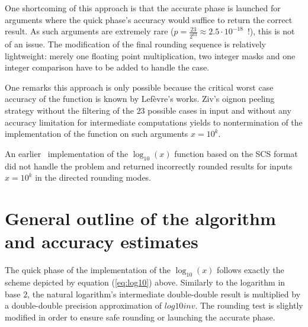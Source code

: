 One shortcoming of this approach is that the
accurate phase is launched for arguments where the quick phase's
accuracy would suffice to return the correct result. As
such arguments are extremely rare ($p = \frac{23}{2^{63}} \approx 2.5
\cdot 10^{-18}$~!), this is not of an issue. The modification of the
final rounding sequence is relatively lightweight: merely one floating
point multiplication, two integer masks and one integer comparison
have to be added to handle the case.

One remarks this approach is only possible because the critical worst
case accuracy of the function is known by Lef{\`e}vre's works. Ziv's oignon peeling
strategy without the filtering of the
$23$ possible cases in input and without any accuracy limitation for
intermediate computations yields to nontermination of the
implementation of the function on such arguments $x = 10^k$.

An earlier \crlibm\ implementation of the $\log_{10}\left(x\right)$
function based on the SCS format did not handle the problem and
returned incorrectly rounded results for inputs $x = 10^k$ in the
directed rounding modes.


\section{General outline of the algorithm and accuracy estimates}\label{subsec:outlinelog10}
% 

The quick phase of the implementation of the $\log_{10}\left( x
\right)$ follows exactly the scheme depicted by equation
(\ref{eq:log10}) above. Similarly to the logarithm in base
$2$, the natural logarithm's intermediate double-double result is
multiplied by a double-double precision approximation of
$\mathit{log10inv}$. The rounding test is slightly modified in order
to ensure safe rounding or launching the accurate phase.

